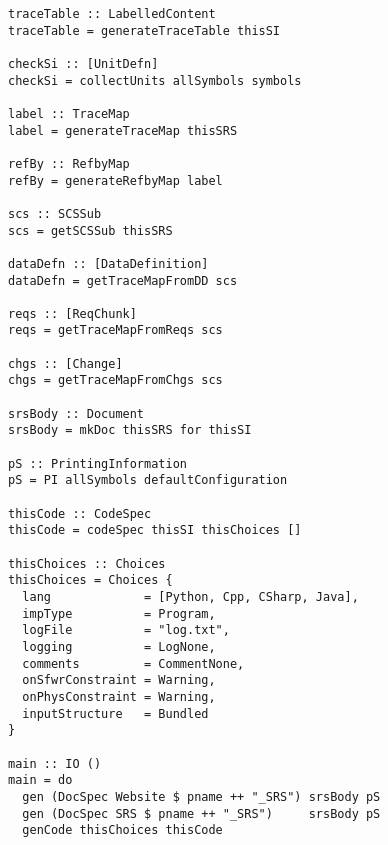 \begin{tcolorbox}[breakable, toprule at break=0pt, bottomrule at break=0pt]
\begin{verbatim}
traceTable :: LabelledContent
traceTable = generateTraceTable thisSI

checkSi :: [UnitDefn]
checkSi = collectUnits allSymbols symbols

label :: TraceMap
label = generateTraceMap thisSRS

refBy :: RefbyMap
refBy = generateRefbyMap label

scs :: SCSSub
scs = getSCSSub thisSRS

dataDefn :: [DataDefinition]
dataDefn = getTraceMapFromDD scs

reqs :: [ReqChunk]
reqs = getTraceMapFromReqs scs

chgs :: [Change]
chgs = getTraceMapFromChgs scs

srsBody :: Document
srsBody = mkDoc thisSRS for thisSI

pS :: PrintingInformation
pS = PI allSymbols defaultConfiguration

thisCode :: CodeSpec
thisCode = codeSpec thisSI thisChoices []

thisChoices :: Choices
thisChoices = Choices {
  lang             = [Python, Cpp, CSharp, Java],
  impType          = Program,
  logFile          = "log.txt",
  logging          = LogNone,
  comments         = CommentNone,
  onSfwrConstraint = Warning,
  onPhysConstraint = Warning,
  inputStructure   = Bundled
}

main :: IO ()
main = do
  gen (DocSpec Website $ pname ++ "_SRS") srsBody pS
  gen (DocSpec SRS $ pname ++ "_SRS")     srsBody pS
  genCode thisChoices thisCode

\end{verbatim}
\end{tcolorbox}